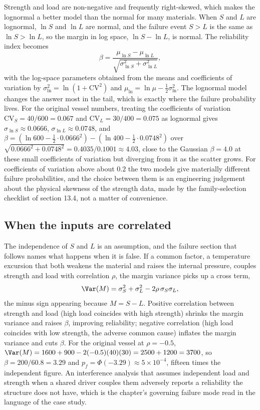 Strength and load are non-negative and frequently right-skewed, which
makes the lognormal a better model than the normal for many
materials. When $S$ and $L$ are lognormal, $\ln S$ and $\ln L$ are
normal, and the failure event $S > L$ is the same as $\ln S > \ln L$,
so the margin in log space, $\ln S - \ln L$, is normal. The reliability
index becomes
\[
\beta = \frac{\mu_{\ln S} - \mu_{\ln L}}
{\sqrt{\sigma_{\ln S}^{2} + \sigma_{\ln L}^{2}}},
\]
with the log-space parameters obtained from the means and coefficients
of variation by $\sigma_{\ln}^{2} = \ln(1 + \mathrm{CV}^{2})$ and
$\mu_{\ln} = \ln \mu - \tfrac12 \sigma_{\ln}^{2}$. The lognormal model
changes the answer most in the tail, which is exactly where the failure
probability lives. For the original vessel numbers, treating the
coefficients of variation $\mathrm{CV}_{S} = 40/600 = 0.067$ and
$\mathrm{CV}_{L} = 30/400 = 0.075$ as lognormal gives $\sigma_{\ln S}
\approx 0.0666$, $\sigma_{\ln L} \approx 0.0748$, and $\beta =
(\ln 600 - \tfrac12 \cdot 0.0666^{2}) - (\ln 400 - \tfrac12 \cdot
0.0748^{2})$ over $\sqrt{0.0666^{2} + 0.0748^{2}} = 0.4035/0.1001
\approx 4.03$, close to the Gaussian $\beta = 4.0$ at these small
coefficients of variation but diverging from it as the scatter grows.
For coefficients of variation above about $0.2$ the two models give
materially different failure probabilities, and the choice between
them is an engineering judgement about the physical skewness of the
strength data, made by the family-selection checklist of section 13.4,
not a matter of convenience.

\subsection{When the inputs are correlated}

The independence of $S$ and $L$ is an assumption, and the failure
section that follows names what happens when it is false. If a common
factor, a temperature excursion that both weakens the material and
raises the internal pressure, couples strength and load with
correlation $\rho$, the margin variance picks up a cross term,
\[
\Var(M) = \sigma_{S}^{2} + \sigma_{L}^{2} - 2\rho\,\sigma_{S}\sigma_{L},
\]
the minus sign appearing because $M = S - L$. Positive correlation
between strength and load (high load coincides with high strength)
shrinks the margin variance and raises $\beta$, improving reliability;
negative correlation (high load coincides with low strength, the
adverse common cause) inflates the margin variance and cuts $\beta$.
For the original vessel at $\rho = -0.5$, $\Var(M) = 1600 + 900 -
2(-0.5)(40)(30) = 2500 + 1200 = 3700$, so $\beta = 200/60.8 = 3.29$
and $p_{f} = \Phi(-3.29) \approx 5 \times 10^{-4}$, fifteen times the
independent figure. An interference analysis that assumes independent
load and strength when a shared driver couples them adversely reports
a reliability the structure does not have, which is the chapter's
governing failure mode read in the language of the case study.

